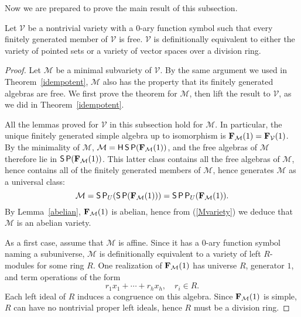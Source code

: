Now we are prepared to prove the main result of this subsection.

\begin{thm}
  Let $\mathcal V$ be a nontrivial variety with a $0$-ary function symbol
  such that every finitely generated member of $\mathcal V$ is free.
  $\mathcal V$ is definitionally equivalent to either the variety of
  pointed sets or a variety of vector spaces over a division ring.  
\end{thm}

\begin{proof}
  Let $\mathcal M$ be a minimal subvariety of $\mathcal V$.
  By the same argument we used in Theorem~\ref{idempotent},
  $\mathcal M$ also has the property that its finitely generated
  algebras are free. We first prove the theorem for $\mathcal M$,
  then lift the result to $\mathcal V$, as we did in Theorem~\ref{idempotent}.

  All the lemmas proved for $\mathcal V$ in this subsection
  hold for $\mathcal M$. In particular, the unique finitely generated
  simple algebra up to isomorphism is ${{\mathbf{\uppercase{f}}}}_{\mathcal M}(1) = {{\mathbf{\uppercase{f}}}}_{\mathcal V}(1)$.
  By the minimality of $\mathcal M$,
  ${\mathcal M}=\operatorname{\mathsf{H}}\operatorname{\mathsf{S}}\operatorname{\mathsf{P}}({{\mathbf{\uppercase{f}}}}_{\mathcal M}(1))$, and the free algebras
  of $\mathcal M$ therefore lie in $\operatorname{\mathsf{S}}\operatorname{\mathsf{P}}({{\mathbf{\uppercase{f}}}}_{\mathcal M}(1))$. This
  latter class contains all the free algebras of $\mathcal M$,
  hence contains all of the finitely generated members of $\mathcal M$,
  hence generates $\mathcal M$ as a universal class:
\begin{equation}\label{Mvariety}
  {\mathcal M} =
  \operatorname{\mathsf{S}}\operatorname{\mathsf{P}}_U(\operatorname{\mathsf{S}}\operatorname{\mathsf{P}}({{\mathbf{\uppercase{f}}}}_{\mathcal M}(1)))=\operatorname{\mathsf{S}}\operatorname{\mathsf{P}}\operatorname{\mathsf{P}}_U({{\mathbf{\uppercase{f}}}}_{\mathcal M}(1)).
  \end{equation}
  By Lemma~\ref{abelian},
  ${{\mathbf{\uppercase{f}}}}_{\mathcal M}(1)$ is abelian, hence from (\ref{Mvariety})
  we deduce that $\mathcal M$ is an abelian variety.

  As a first case, assume that $\mathcal M$ is affine. 
  Since it has a $0$-ary function symbol naming a subuniverse,
  $\mathcal M$ is definitionally equivalent to a variety of
  left $R$-modules for some ring $R$. One realization of 
  ${{\mathbf{\uppercase{f}}}}_{\mathcal M}(1)$ has universe $R$, generator $1$, and term operations
  of the form
  \[
r_1x_1+\cdots + r_hx_h,\quad r_i\in R.
\]
Each left ideal of $R$ induces a congruence on this algebra.
Since ${{\mathbf{\uppercase{f}}}}_{\mathcal M}(1)$ is simple, $R$ can have no nontrivial
proper left ideals, hence $R$ must be a division ring.


\end{proof}
